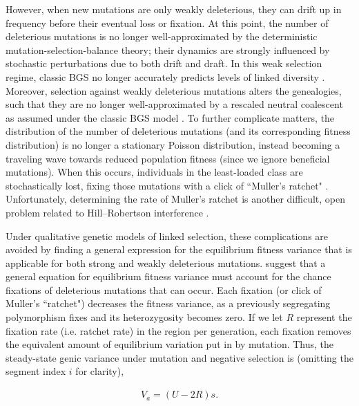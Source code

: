 \documentclass[11pt]{article}
\begin{document}
However, when new mutations are only weakly deleterious, they can drift up in
frequency before their eventual loss or fixation. At this point, the number of
deleterious mutations is no longer well-approximated by the deterministic
mutation-selection-balance theory; their dynamics are strongly influenced by
stochastic perturbations due to both drift and draft. In this weak selection
regime, classic BGS no longer accurately predicts levels of linked diversity
\parencite{Charlesworth1993-gb,McVean2000-bt,Good2013-lp,Gordo2002-dr}.
Moreover, selection against weakly deleterious mutations alters the
genealogies, such that they are no longer well-approximated by a rescaled
neutral coalescent as assumed under the classic BGS model
\parencite{Przeworski1999-mb,OFallon2010-my,Higgs1995-xc}. To further
complicate matters, the distribution of the number of deleterious mutations
(and its corresponding fitness distribution) is no longer a stationary Poisson
distribution, instead becoming a traveling wave
\parencite{Rouzine2008-qz,Good2013-lp,Gessler1995-hz} towards reduced
population fitness (since we ignore beneficial mutations). When this occurs,
individuals in the least-loaded class are stochastically lost, fixing those
mutations with a click of ``Muller's ratchet"
\parencite{Muller1964-ki,Charlesworth1997-qn}. Unfortunately, determining the
rate of Muller's ratchet is another difficult, open problem
\parencite{Haigh1978-gt,Gordo2002-dr,Gessler1995-hz,Higgs1995-xc} related to
Hill--Robertson interference \parencite{Felsenstein1974-xm}.

Under qualitative genetic models of linked selection, these complications are
avoided by finding a general expression for the equilibrium fitness variance
that is applicable for both strong and weakly deleterious mutations.
\textcite{Santiago2016-mu} suggest that a general equation for equilibrium
fitness variance must account for the chance fixations of deleterious mutations
that can occur. Each fixation (or click of Muller's ``ratchet") decreases the
fitness variance, as a previously segregating polymorphism fixes and its
heterozygosity becomes zero. If we let $R$ represent the fixation rate (i.e.
ratchet rate) in the region per generation, each fixation removes the
equivalent amount of equilibrium variation put in by mutation. Thus, the
steady-state genic variance under mutation and negative selection is (omitting
the segment index $i$ for clarity),

\begin{align}
  \label{eq:Va}
  V_{a} = (U - 2 R)s. 
\end{align}
\end{document}
